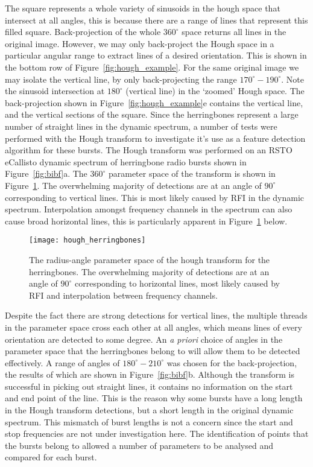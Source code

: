 The square represents a whole variety of sinusoids in the hough space that intersect at all angles, this is because there are a range of lines that represent this filled square. Back-projection of the whole $360^{\circ}$ space returns all lines in the original image. However, we may only back-project the Hough space in a particular angular range to extract lines of a desired orientation. This is shown in the bottom row of Figure~\ref{fig:hough_example}. For the same original image we may isolate the vertical line, by only back-projecting the range $170^{\circ}-190^{\circ}$. Note the sinusoid intersection at $180^{\circ}$ (vertical line) in the `zoomed' Hough space. The back-projection shown in Figure~\ref{fig:hough_example}e contains the vertical line, and the vertical sections of the square.
%
%
Since the herringbones represent a large number of straight lines in the dynamic spectrum, a number of tests were performed with the Hough transform to investigate it's use as a feature detection algorithm for these bursts. The Hough transform was performed on an RSTO eCallisto dynamic spectrum of herringbone radio bursts shown in Figure~\ref{fig:bibf}a. The $360^{\circ}$ parameter space of the transform is shown in Figure~\ref{fig:hough_hb}. The overwhelming majority of detections are at an angle of $90^{\circ}$ corresponding to vertical lines. This is most likely caused by RFI in the dynamic spectrum. Interpolation amongst frequency channels in the spectrum can also cause broad horizontal lines, this is particularly apparent in Figure~\ref{fig:hough_hb} below.
%
% 
\begin{figure}[t!]
\begin{center}
\texttt{[image: hough\_herringbones]}
\caption[Hough transform]{The radius-angle parameter space of the hough transform for the herringbones. The overwhelming majority of detections are at an angle of $90^{\circ}$ corresponding to horizontal lines, most likely caused by RFI and interpolation between frequency channels.}
\label{fig:hough_hb}
\end{center}
\end{figure}
%
%
Despite the fact there are strong detections for vertical lines, the multiple threads in the parameter space cross each other at all angles, which means lines of every orientation are detected to some degree. An {\it a priori} choice of angles in the parameter space that the herringbones belong to will allow them to be detected effectively. A range of angles of $180^{\circ}-210^{\circ}$ was chosen for the back-projection, the results of which are shown in Figure~\ref{fig:bibf}b. Although the transform is successful in picking out straight lines, it contains no information on the start and end point of the line. This is the reason why some bursts have a long length in the Hough transform detections, but a short length in the original dynamic spectrum. This mismatch of burst lengths is not a concern since the start and stop frequencies are not under investigation here. The identification of points that the bursts belong to allowed a number of parameters to be analysed and compared for each burst.
